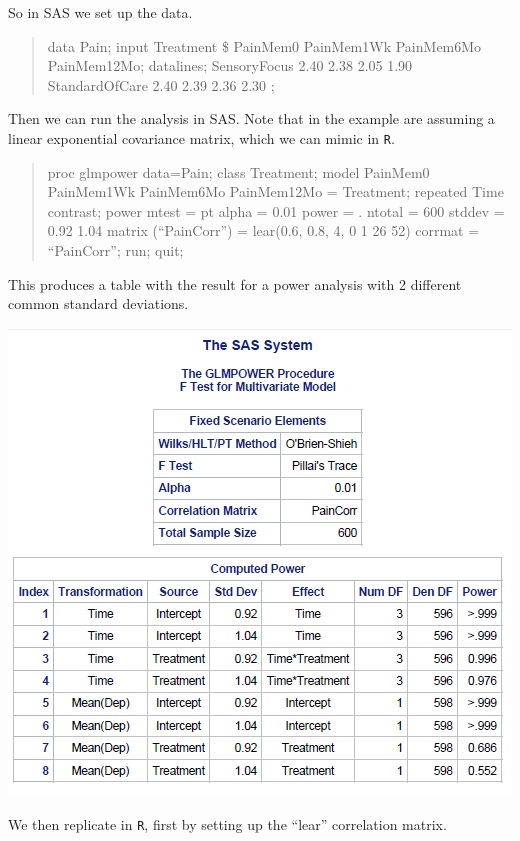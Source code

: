 \documentclass[]{book}
\begin{document}
So in SAS we set up the data.

\begin{quote}
data Pain;
input Treatment \$ PainMem0 PainMem1Wk PainMem6Mo PainMem12Mo;
datalines;
SensoryFocus 2.40 2.38 2.05 1.90
StandardOfCare 2.40 2.39 2.36 2.30
;
\end{quote}

Then we can run the analysis in SAS. Note that in the example \citet{SASglmpower} are assuming a linear exponential covariance matrix, which we can mimic in \texttt{R}.

\begin{quote}
proc glmpower data=Pain;
class Treatment;
model PainMem0 PainMem1Wk PainMem6Mo PainMem12Mo = Treatment;
repeated Time contrast;
power
mtest = pt
alpha = 0.01
power = .
ntotal = 600
stddev = 0.92 1.04
matrix (``PainCorr'') = lear(0.6, 0.8, 4, 0 1 26 52)
corrmat = ``PainCorr'';
run;
quit;
\end{quote}

This produces a table with the result for a power analysis with 2 different common standard deviations.

\includegraphics{screenshots/sas_pain.png}

We then replicate in \texttt{R}, first by setting up the ``lear'' correlation matrix.
\end{document}
